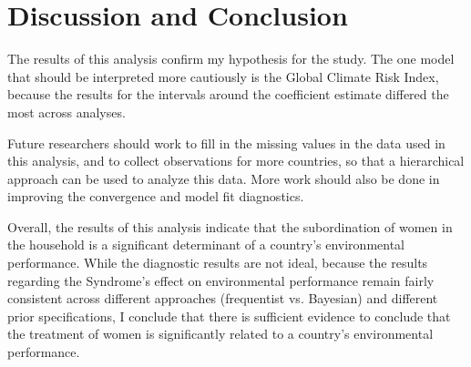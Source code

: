 \documentclass[letterpaper,10.5pt]{article}
\begin{document}
\section{Discussion and Conclusion}

The results of this analysis confirm my hypothesis for the study. The one model that should be interpreted more cautiously is the Global Climate Risk Index, because the results for the intervals around the coefficient estimate differed the most across analyses.

Future researchers should work to fill in the missing values in the data used in this analysis, and to collect observations for more countries, so that a hierarchical approach can be used to analyze this data. More work should also be done in improving the convergence and model fit diagnostics. 

Overall, the results of this analysis indicate that the subordination of women in the household is a significant determinant of a country's environmental performance. While the diagnostic results are not ideal, because the results regarding the Syndrome's effect on environmental performance remain fairly consistent across different approaches (frequentist vs. Bayesian) and different prior specifications, I conclude that there is sufficient evidence to conclude that the treatment of women is significantly related to a country's environmental performance.
\end{document}
